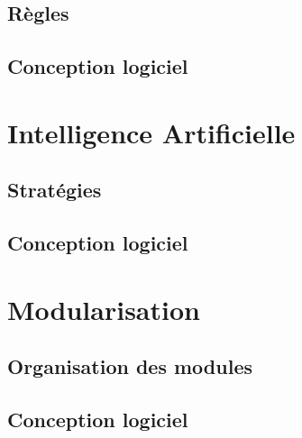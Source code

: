 \documentclass[a4paper,12pt]{article}
\begin{document}
\subsection{Règles}


\subsection{Conception logiciel}



\clearpage
\section{Intelligence Artificielle}

\subsection{Stratégies}


\subsection{Conception logiciel}



\clearpage
\section{Modularisation}
\label{sec:module}

\subsection{Organisation des modules}


\subsection{Conception logiciel}


%
\end{document}
